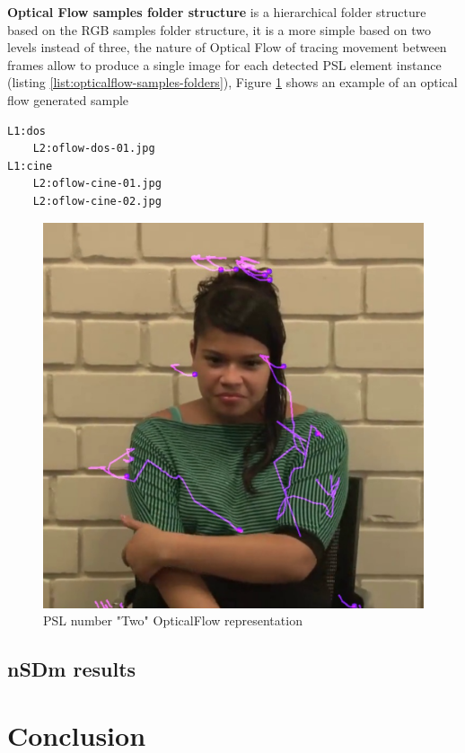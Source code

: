 \documentclass[twocolumn,conference]{article}
\begin{document}
\textbf{Optical Flow samples folder structure} is a hierarchical folder structure based on the RGB samples folder structure, it is a more simple based on two levels instead of three, the nature of Optical Flow of tracing movement between frames allow to produce a single image for each detected PSL element instance (listing \ref{list:opticalflow-samples-folders}), Figure \ref{fig:opticalflow-two} shows an example of an optical flow generated sample
\begin{lstlisting}[caption=Optical Flow Samples Folder Structure example, basicstyle=\ttfamily\small]
L1:dos
	L2:oflow-dos-01.jpg
L1:cine
	L2:oflow-cine-01.jpg
	L2:oflow-cine-02.jpg
\end{lstlisting}\label{list:opticalflow-samples-folders}
\begin{figure}[hbt!]
\includegraphics[width=\linewidth]{images/dos-opticalflow.jpg}
\caption{PSL number "Two" OpticalFlow representation}
\label{fig:opticalflow-two}
\end{figure}

\subsection{nSDm results}

\section{Conclusion}\label{conclusion}



\end{document}
